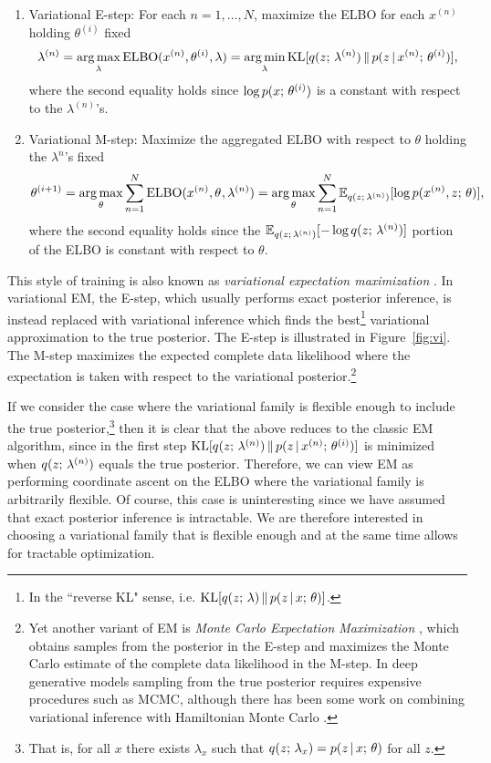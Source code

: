 \documentclass{article}
\begin{document}
\begin{enumerate}
\item Variational E-step: For each $n = 1, \dots, N$, maximize the ELBO for each $x^{(n)}$ holding $\theta^{(i)}$ fixed
\[ \lambda^{(n)} = \argmax_{\lambda} \ELBO(x^{(n)}, \theta^{(i)}, \lambda) = \argmin_{\lambda}
\KL[q(z \param \lambda^{(n)})  \, \Vert \, p(z \given x^{(n)} \param \theta^{(i)})], \]
where the second equality holds since $\log p(x ; \, \theta^{(i)})$ is a constant with respect to the $\lambda^{(n)}$'s.
\item Variational M-step: Maximize the aggregated ELBO with respect to $\theta$ holding the $\lambda^{n}$'s fixed
\[ \theta^{(i+1)} = \argmax_{\theta} \sum_{n=1}^N \ELBO(x^{(n)}, \theta^{}, \lambda^{(n)}) = 
\argmax_{\theta} \sum_{n=1}^N \E_{q(z \param \lambda^{(n)})}[\log p(x^{(n)}, z \param \theta)],  \]
where the second equality holds since the $\mathbb{E}_{q(z ; \, \lambda^{(n)})}[-\log q(z ; \, \lambda^{(n)})]$
portion of the ELBO is constant with respect to $\theta$.
\end{enumerate}
This style of training is also known as \emph{variational expectation maximization} \citep{neal1998}. In variational EM,
the E-step, which usually performs exact posterior inference, is instead replaced with variational inference which finds the best\footnote{In the ``reverse KL" sense, i.e. $\operatorname*{KL}[q(z ; \, \lambda)  \, \Vert \, p(z \,|\, x ; \, \theta)]$.} variational approximation to the true posterior. The E-step is illustrated in Figure~\ref{fig:vi}. The M-step maximizes the expected complete data likelihood where the expectation is taken with respect to the variational posterior.\footnote{Yet another variant of EM is \emph{Monte Carlo Expectation Maximization} \citep{wei1990mcem}, which obtains samples from the posterior in the E-step and maximizes the Monte Carlo estimate of the complete data likelihood in the M-step. In deep generative models sampling from the true posterior requires expensive procedures such as MCMC, although there has been some work on combining
variational inference with Hamiltonian Monte Carlo \citep{Salimans2015,hoffman2017}.}

If we consider the case where the variational family is flexible enough to include the true posterior,\footnote{That is, for all $x$ there exists $\lambda_x$ such that $q(z ; \, \lambda_x) = p(z \,|\, x ; \, \theta)$ for all $z$.} then it is clear that the above reduces to the classic EM algorithm, since in the first step $\operatorname*{KL}[q(z ; \, \lambda^{(n)})  \, \Vert \, p(z \,|\, x^{(n)} ; \, \theta^{(i)})]$ is minimized when $q(z ; \, \lambda^{(n)})$ equals the true posterior.
Therefore, we can view EM as performing coordinate ascent on the ELBO where the variational family is arbitrarily
flexible. Of course, this case is uninteresting since we have assumed that exact posterior inference is
intractable. We are therefore interested in choosing a  variational family that is flexible enough
and at the same time allows for tractable optimization.  
\end{document}

